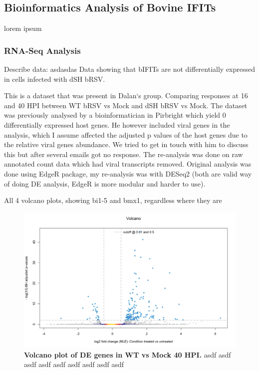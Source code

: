 \subsection{Bioinformatics Analysis of Bovine IFITs} \label{subsec:Bioinformatics Analysis of Bovine IFITs}
lorem ipsum

\subsubsection{RNA-Seq Analysis}
 \label{Validation by analysing bRSV RNAseq dataset}
Describe data: \newline
asdasdas \newline
Data showing that bIFITs are not differentially expressed in cells infected with dSH bRSV.

This is a dataset that was present in Dalan`s group. Comparing responses at 16 and 40 HPI between WT bRSV vs Mock and dSH bRSV vs Mock. The dataset was previously analysed by a bioinformatician in Pirbright which yield 0 differentially expressed host genes. He however included viral genes in the analysis, which I assume affected the adjusted p values of the host genes due to the relative viral genes abundance. We tried to get in touch with him to discuss this but after several emails got no response. The re-analysis was done on raw annotated count data which had viral transcripts removed. Original analysis was done using EdgeR package, my re-analysis was with DESeq2 (both are valid way of doing DE analysis, EdgeR is more modular and harder to use).

All 4 volcano plots, showing bi1-5 and bmx1, regardless where they are

\begin{figure}
    \centering
    \includegraphics[width=1\linewidth]{07. Chapter 2//Figs/14. rnaseq volcano.png}
    \caption[Volcano plot of DE genes in WT vs Mock 40 HPI.]{\textbf{Volcano plot of DE genes in WT vs Mock 40 HPI.} asdf asdf asdf asdf asdf asdf asdf asdf asdf }
    \label{fig:Volcano plot of DE genes in WT vs Mock 40 HPI}
\end{figure}

